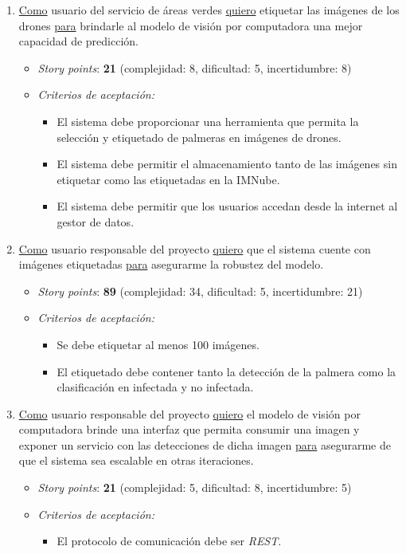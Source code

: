 \documentclass[
11pt, %
]{charter}
\begin{document}
\begin{enumerate}
  \item \underline{Como} usuario del servicio de áreas verdes \underline{quiero} etiquetar las imágenes de los drones \underline{para} brindarle al modelo de visión por computadora una mejor capacidad de predicción.
        \begin{itemize}
          \item \textit{Story points}: \textbf{21} (complejidad: 8, dificultad: 5, incertidumbre: 8)
          \item \textit{Criterios de aceptación:}
                \begin{itemize}
                  \item El sistema debe proporcionar una herramienta que permita la selección y etiquetado de palmeras en imágenes de drones.
                  \item El sistema debe permitir el almacenamiento tanto de las imágenes sin etiquetar como las etiquetadas en la IMNube.
                  \item El sistema debe permitir que los usuarios accedan desde la internet al gestor de datos.
                \end{itemize}
        \end{itemize}

  \item \underline{Como} usuario responsable del proyecto \underline{quiero} que el sistema cuente con imágenes etiquetadas \underline{para} asegurarme la robustez del modelo.
        \begin{itemize}
          \item \textit{Story points}: \textbf{89} (complejidad: 34, dificultad: 5, incertidumbre: 21)
          \item \textit{Criterios de aceptación:}
                \begin{itemize}
                  \item Se debe etiquetar al menos 100 imágenes.
                  \item El etiquetado debe contener tanto la detección de la palmera como la clasificación en infectada y no infectada.
                \end{itemize}
        \end{itemize}

  \item \underline{Como} usuario responsable del proyecto \underline{quiero} el modelo de visión por computadora brinde una interfaz que permita consumir una imagen y exponer un servicio con las detecciones de dicha imagen \underline{para} asegurarme de que el sistema sea escalable en otras iteraciones.
        \begin{itemize}
          \item \textit{Story points}: \textbf{21} (complejidad: 5, dificultad: 8, incertidumbre: 5)
          \item \textit{Criterios de aceptación:}
                \begin{itemize}
                  \item El protocolo de comunicación debe ser \textit{REST}.
                \end{itemize}
        \end{itemize}


\end{enumerate}
\end{document}

